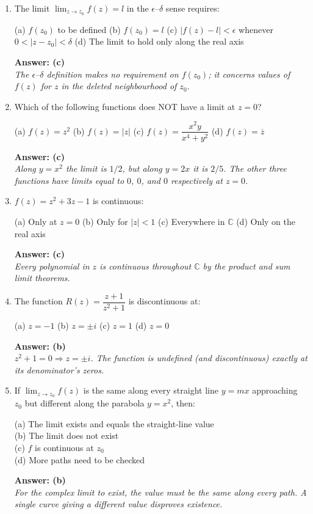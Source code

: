 \documentclass[12pt,a4paper]{article}
\begin{document}
\begin{enumerate}[leftmargin=*, label=\textbf{MCQ \arabic*.}]

\item The limit $\lim_{z \to z_0} f(z) = l$ in the $\epsilon$--$\delta$ sense requires:

(a) $f(z_0)$ to be defined \quad
(b) $f(z_0) = l$ \quad
(c) $|f(z) - l| < \epsilon$ whenever $0 < |z - z_0| < \delta$ \quad
(d) The limit to hold only along the real axis

\textbf{Answer: (c)}\\
\textit{The $\epsilon$--$\delta$ definition makes no requirement on $f(z_0)$;
it concerns values of $f(z)$ for $z$ in the \emph{deleted} neighbourhood of $z_0$.}

\item Which of the following functions does NOT have a limit at $z = 0$?

(a) $f(z) = z^2$ \quad
(b) $f(z) = |z|$ \quad
(c) $f(z) = \dfrac{x^2y}{x^4+y^2}$ \quad
(d) $f(z) = \overline{z}$

\textbf{Answer: (c)}\\
\textit{Along $y = x^2$ the limit is $1/2$, but along $y = 2x$ it is $2/5$.
The other three functions have limits equal to $0$, $0$, and $0$ respectively at $z=0$.}

\item $f(z) = z^2 + 3z - 1$ is continuous:

(a) Only at $z = 0$ \quad
(b) Only for $|z| < 1$ \quad
(c) Everywhere in $\mathbb{C}$ \quad
(d) Only on the real axis

\textbf{Answer: (c)}\\
\textit{Every polynomial in $z$ is continuous throughout $\mathbb{C}$ by the
product and sum limit theorems.}

\item The function $R(z) = \dfrac{z+1}{z^2+1}$ is discontinuous at:

(a) $z = -1$ \quad
(b) $z = \pm i$ \quad
(c) $z = 1$ \quad
(d) $z = 0$

\textbf{Answer: (b)}\\
\textit{$z^2 + 1 = 0 \Rightarrow z = \pm i$.  The function is undefined (and discontinuous)
exactly at its denominator's zeros.}

\item If $\lim_{z \to z_0} f(z)$ is the same along every straight line $y = mx$
approaching $z_0$ but different along the parabola $y = x^2$, then:

(a) The limit exists and equals the straight-line value \\
(b) The limit does not exist \\
(c) $f$ is continuous at $z_0$ \\
(d) More paths need to be checked

\textbf{Answer: (b)}\\
\textit{For the complex limit to exist, the value must be the same along
\emph{every} path.  A single curve giving a different value disproves existence.}

\end{enumerate}
\end{document}

